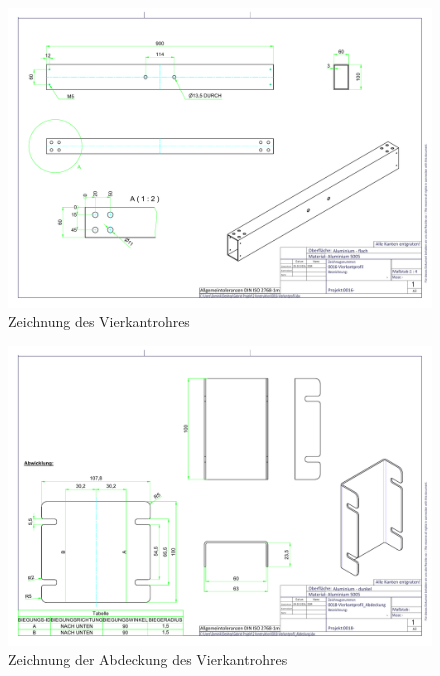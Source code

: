 \begin{figure}[h!]
	\includegraphics[angle=90,width=\textwidth]{../ref/0016-Vierkantprofil.pdf}
	\caption{Zeichnung des Vierkantrohres}
	\label{fig:Zeichnung-Vierkantrohr}
\end{figure}

\begin{figure}[h!]
	\includegraphics[angle=90,width=\textwidth]{../ref/0018-Vierkantprofil_Abdeckung.pdf}
	\caption{Zeichnung der Abdeckung des Vierkantrohres}
	\label{fig:Zeichnung-Vierkantrohr-Abdeckung}
\end{figure}

